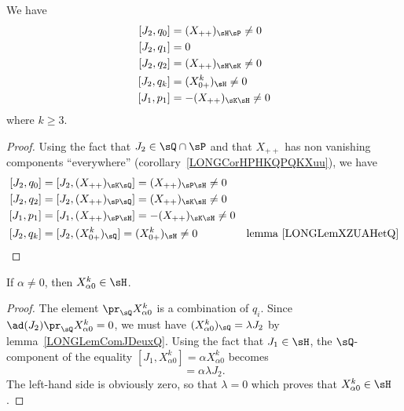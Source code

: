 \begin{lemma}		\label{LONGLemComJDeuxQ}
	We have
	\begin{equation}
		\begin{aligned}[]
			[J_2,q_0]&=(X_{++})_{\sH\sP}\neq 0\\
			[J_2,q_1]&=0\\
			[J_2,q_2]&=(X_{++})_{\sH\sK}\neq 0\\
			[J_2,q_k]&=(X^k_{0+})_{\sH}\neq 0\\
			[J_1,p_1]&=-(X_{++})_{\sK\sH}\neq 0
		\end{aligned}
	\end{equation}
	where $k\geq 3$.
\end{lemma}

\begin{proof}
	Using the fact that $J_2\in\sQ\cap\sP$ and that $X_{++}$ has non vanishing components ``everywhere'' (corollary~\ref{LONGCorHPHKQPQKXuu}), we have
	\begin{equation}
		\begin{aligned}[]
			[J_2,q_0]&=[J_2,(X_{++})_{\sK\sQ}]=(X_{++})_{\sP\sH}\neq 0\\
			[J_2,q_2]&=[J_2,(X_{++})_{\sP\sQ}]=(X_{++})_{\sK\sH}\neq 0\\
			[J_1,p_1]&=[J_1,(X_{++})_{\sP\sH}]=-(X_{++})_{\sK\sH}\neq 0\\
			[J_2,q_k]&=[J_2,(X_{0+}^k)_{\sQ}]=(X^k_{0+})_{\sH}\neq 0		&\text{lemma~\ref{LONGLemXZUAHetQ}}\\
		\end{aligned}
	\end{equation}
\end{proof}

\begin{lemma}		\label{LONGLemNonHXaz}
	If $\alpha\neq 0$, then $X_{\alpha 0}^k\in\sH$.
\end{lemma}

\begin{proof}
	The element $\pr_{\sQ}X^k_{\alpha 0}$ is a combination of $q_i$. Since $\ad(J_2)\pr_{\sQ}X^k_{\alpha 0}=0$, we must have $(X^k_{\alpha 0})_{\sQ}=\lambda J_2$ by lemma~\ref{LONGLemComJDeuxQ}. Using the fact that $J_1\in\sH$, the $\sQ$-component of the equality $[J_1,X^k_{\alpha 0}]=\alpha X^k_{\alpha 0}$ becomes
	\begin{equation}
		[J_1,\lambda J_2]=\alpha\lambda J_2.
	\end{equation}
	The left-hand side is obviously zero, so that $\lambda=0$ which proves that $X^k_{\alpha 0}\in\sH$.
\end{proof}


